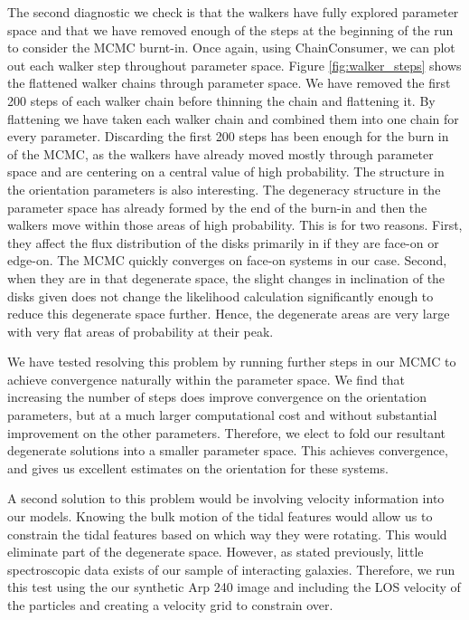The second diagnostic we check is that the walkers have fully explored parameter space and that we have removed enough of the steps at the beginning of the run to consider the MCMC burnt-in. Once again, using ChainConsumer, we can plot out each walker step throughout parameter space. Figure \ref{fig:walker_steps} shows the flattened walker chains through parameter space. We have removed the first 200 steps of each walker chain before thinning the chain and flattening it. By flattening we have taken each walker chain and combined them into one chain for every parameter. Discarding the first 200 steps has been enough for the burn in of the MCMC, as the walkers have already moved mostly through parameter space and are centering on a central value of high probability. The structure in the orientation parameters is also interesting. The degeneracy structure in the parameter space has already formed by the end of the burn-in and then the walkers move within those areas of high probability. This is for two reasons. First, they affect the flux distribution of the disks primarily in if they are face-on or edge-on. The MCMC quickly converges on face-on systems in our case. Second, when they are in that degenerate space, the slight changes in inclination of the disks given does not change the likelihood calculation significantly enough to reduce this degenerate space further. Hence, the degenerate areas are very large with very flat areas of probability at their peak.

We have tested resolving this problem by running further steps in our MCMC to achieve convergence naturally within the parameter space. We find that increasing the number of steps does improve convergence on the orientation parameters, but at a much larger computational cost and without substantial improvement on the other parameters. Therefore, we elect to fold our resultant degenerate solutions into a smaller parameter space. This achieves convergence, and gives us excellent estimates on the orientation for these systems.

A second solution to this problem would be involving velocity information into our models. Knowing the bulk motion of the tidal features would allow us to constrain the tidal features based on which way they were rotating. This would eliminate part of the degenerate space. However, as stated previously, little spectroscopic data exists of our sample of interacting galaxies. Therefore, we run this test using the our synthetic Arp 240 image and including the LOS velocity of the particles and creating a velocity grid to constrain over.

